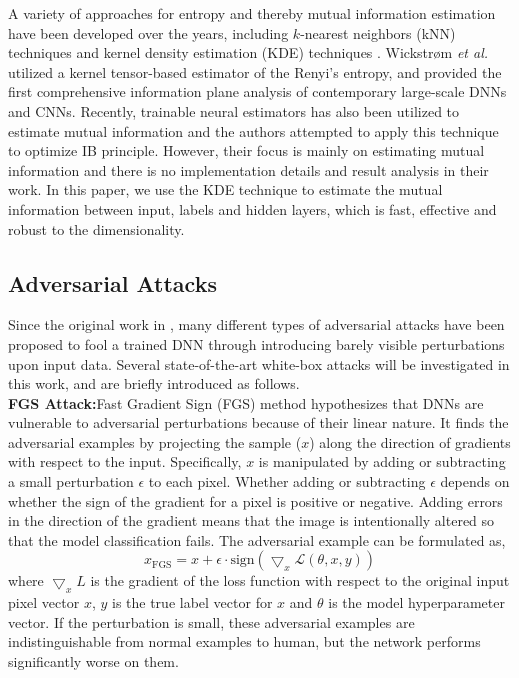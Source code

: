 \documentclass[10pt,journal,compsoc]{IEEEtran}
\begin{document}
A variety of approaches for entropy and thereby mutual information estimation have been developed over the years, including $k$-nearest neighbors (kNN) techniques \cite{Lord2018GeometricKN} and kernel density estimation (KDE) techniques \cite{Kandasamy2015NonparametricVM, Han2017OptimalRO}. Wickstr{\o}m \emph{et al.} \cite{Wickstrm2019InformationPA} utilized a kernel tensor-based estimator of the Renyi's entropy, and provided the first comprehensive information plane analysis of contemporary large-scale DNNs and CNNs. Recently, trainable neural estimators \cite{Belghazi2018MutualIN} has also been utilized to estimate mutual information and the authors attempted to apply this technique to optimize IB principle. However, their focus is mainly on estimating mutual information and there is no implementation details and result analysis in their work. 
In this paper, we use the KDE technique \cite{Kandasamy2015NonparametricVM} to estimate the mutual information between input, labels and hidden layers, which is fast, effective and robust to the dimensionality.


\subsection{Adversarial Attacks}
Since the original work in \cite{Shamir2010LearningAG}, many different types of adversarial attacks have been proposed to fool a trained DNN through introducing barely visible perturbations upon input data. Several state-of-the-art white-box attacks will be investigated in this work, and are briefly introduced as follows.\\

\noindent \textbf{FGS Attack:}\quad  Fast Gradient Sign (FGS) method  \cite{Goodfellow2015ExplainingAH} hypothesizes that DNNs are vulnerable to adversarial perturbations because of their linear nature. It finds the adversarial examples by projecting the sample ($x$) along the direction of gradients with respect to the input. Specifically, $x$ is manipulated by adding or subtracting a small perturbation $\epsilon$ to each pixel. Whether adding or subtracting $\epsilon$ depends on whether the sign of the gradient for a pixel is positive or negative. Adding errors in the direction of the gradient means that the image is intentionally altered so that the model classification fails. The adversarial example can be formulated as,
\begin{equation*}
x_{\text{FGS}} = x + \epsilon \cdot{} \text{sign}(\bigtriangledown_x{}\mathcal{L}(\theta,x,y))
\end{equation*}
where $\bigtriangledown_x{}L$ is the gradient of the loss function with respect to the original input pixel vector $x$, $y$ is the true label vector for $x$ and  $\theta$ is the model hyperparameter vector.
If the perturbation is small, these adversarial examples are indistinguishable from normal examples to human, but the network performs significantly worse on them.\\
\end{document}
